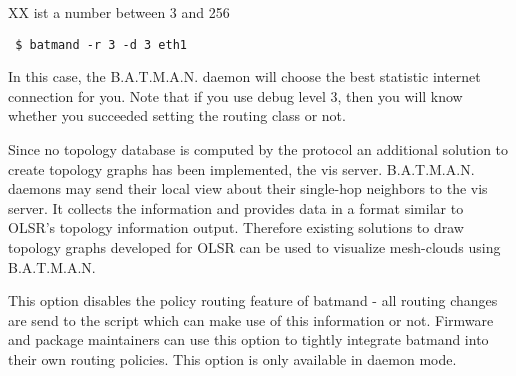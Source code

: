 XX ist a number between 3 and 256

\begin{verbatim}
 $ batmand -r 3 -d 3 eth1
\end{verbatim}
In this case, the B.A.T.M.A.N. daemon will choose the best statistic internet
connection for you. Note that if you use debug level 3, then you will know
whether you succeeded setting the routing class or not.

Since no topology database is computed by the protocol an additional solution to
create topology graphs has been implemented, the vis server. B.A.T.M.A.N.
daemons may send their local view about their single-hop neighbors to the vis
server. It collects the information and provides data in a format similar to
OLSR's topology information output. Therefore existing solutions to draw
topology graphs developed for OLSR can be used to visualize mesh-clouds
using B.A.T.M.A.N.

This option disables the policy routing feature of batmand - all routing changes
are send to the script which can make use of this information or not. Firmware
and package maintainers can use this option to tightly integrate batmand into
their own routing policies. This option is only available in daemon mode.
